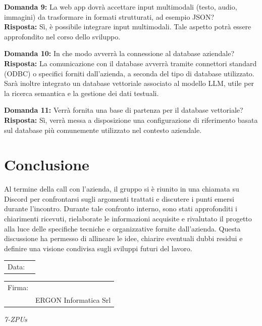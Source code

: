 \documentclass[a4paper,12pt]{article}
\begin{document}
\vspace{2em}

\textbf{Domanda 9:} La web app dovrà accettare input multimodali (testo, audio, immagini) da trasformare in formati strutturati, ad esempio JSON?\\[0.5em]
\textbf{Risposta:} Sì, è possibile integrare input multimodali. Tale aspetto potrà essere approfondito nel corso dello sviluppo.

\vspace{2em}

\textbf{Domanda 10:} In che modo avverrà la connessione al database aziendale?\\[0.5em]
\textbf{Risposta:} La comunicazione con il database avverrà tramite connettori standard (ODBC) o specifici forniti dall’azienda, a seconda del tipo di database utilizzato. Sarà inoltre integrato un database vettoriale associato al modello LLM, utile per la ricerca semantica e la gestione dei dati testuali.

\vspace{2em}

\textbf{Domanda 11:} Verrà fornita una base di partenza per il database vettoriale?\\[0.5em]
\textbf{Risposta:} Sì, verrà messa a disposizione una configurazione di riferimento basata sul database più comunemente utilizzato nel contesto aziendale.

\section{Conclusione}
Al termine della call con l’azienda, il gruppo si è riunito in una chiamata su Discord per confrontarsi sugli argomenti trattati e discutere i punti emersi durante l’incontro.  
Durante tale confronto interno, sono stati approfonditi i chiarimenti ricevuti, rielaborate le informazioni acquisite e rivalutato il progetto alla luce delle specifiche tecniche e organizzative fornite dall’azienda.  
Questa discussione ha permesso di allineare le idee, chiarire eventuali dubbi residui e definire una visione condivisa sugli sviluppi futuri del lavoro.

\vspace{15em}

\begin{tabular}{@{}p{0.5in}p{2in}@{}}
Data: & \hrulefill \\
\end{tabular}

\vspace{1em}

\begin{tabular}{@{}p{0.5in}p{2in}@{}}
Firma: & \hrulefill \\
& ERGON Informatica Srl \\
\end{tabular}

\vfill
\begin{flushright}
    \textit{7-ZPUs}
\end{flushright}
\end{document}
